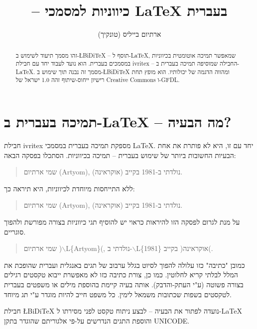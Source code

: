 \documentclass[twocolumn]{article}
\title{\BiDiTeX{} -- כיווניות למסמכי \LaTeX{} בעברית}
\author{ארתיום בייליס (טונקיך)}
\newcommand{\BiDiTeX}{\L{BiDi\TeX{}}}
\newcommand{\bs}{$\backslash$}
\newcommand{\exframe}[1]{\begin{quote} #1 \end{quote} }
\begin{document}
\maketitle
\begin{abstract}
זהו מסמך תיעוד לשימוש ב-\BiDiTeX{} -- תוסף ל-\LaTeX, שמאפשר תמיכה אוטומטית בכיווניות במסמכים בעברית. הוא נועד לעבוד יחד עם חבילת ivritex -- החבילה שמוסיפה תמיכה בעברית ב-\LaTeX. מסמך זה נבנה תוך שימוש ב-\BiDiTeX{} ומהווה הדגמה של יכולותיו. הוא מופץ תחת רישיון ייחוס-שיתוף זהה 1.0 ישראל של Creative Commons ו-GFDL.
\end{abstract}



\section{תמיכה בעברית ב-\LaTeX{} -- מה הבעיה?}
חבילת ivritex מספקת תמיכה בעברית במסמכי \LaTeX. יחד עם זו, היא לא פותרת את אחת הבעיות החשובות ביותר של שימוש בעברית -- תמיכה בכיווניות. הסתכלו בפסקה הבאה:

\exframe{
שמי ארתיום (Artyom), נולדתי ב-1981 בקייב (אוקראינה).
}

ללא התייחסות מיוחדת לכיווניות, היא תיראה כך:

\exframe{
שמי ארתיום (Artyom), נולדתי ב-1981 בקייב (אוקראינה).
}


על מנת לגרום לפסקה הזו להיראות כראוי יש להוסיף תגי כיווניות  בצורה מפורשת ולהפוך סוגריים.

\exframe{
שמי ארתיום )\bs L\{Artyom\}(, נולדתי ב-\bs L\{1981\} בקייב )אוקראינה(.
}

כמובן "כתיבה" כזו עלולה להפוך לסיוט בגלל ערבוב של תגים באנגלית ועברית שהופכת את המלל לבלתי קריא לחלוטין. כמו כן, צורת כתיבה כזו לא מאפשרת ייבוא טקסטים רגילים בצורה פשוטה (ע"י העתק-והדבק). אותה בעיה קיימת בהוספת מילים או משפטים בעברית לטקסטים בשפות שכתובות משמאל לימין. כל משפט חייב להיות מוגדר ע"י תג מיוחד.

חבילת \BiDiTeX{} נועדה לפתור את הבעיה -- לבצע ניתוח טקסט לפני מסירתו ל-\LaTeX{} והוספת התגים הנדרשים על-פי אלגוריתם שהוגדר בתקן UNICODE.
\end{document}
